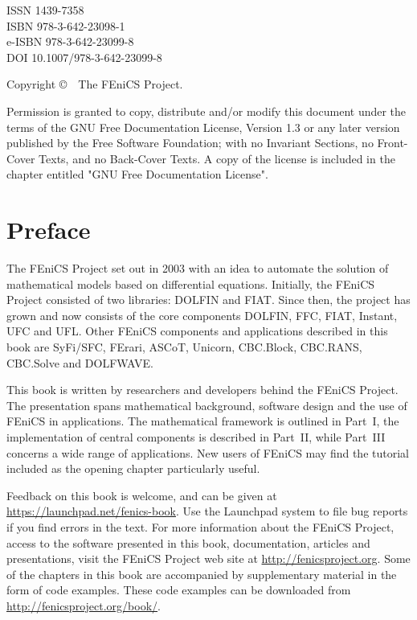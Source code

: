 \vfill

\noindent
ISSN 1439-7358 \\
ISBN 978-3-642-23098-1 \\
e-ISBN 978-3-642-23099-8 \\
DOI 10.1007/978-3-642-23099-8

\vspace{2ex}

\noindent
{\footnotesize Copyright \copyright\ \the\year\ The FEniCS Project.}

\vspace{2ex}

\noindent
{\footnotesize
Permission is granted to copy, distribute and/or modify this document
under the terms of the GNU Free Documentation License, Version 1.3 or
any later version published by the Free Software Foundation; with no
Invariant Sections, no Front-Cover Texts, and no Back-Cover Texts.  A
copy of the license is included in the chapter entitled "GNU Free
Documentation License".}

\tableofcontents

\chapter*{Preface}

\thispagestyle{empty}

The FEniCS Project set out in 2003 with an idea to automate the
solution of mathematical models based on differential equations.
Initially, the FEniCS Project consisted of two libraries: DOLFIN and
FIAT. Since then, the project has grown and now consists of the core
components DOLFIN, FFC, FIAT, Instant, UFC and UFL. Other FEniCS
components and applications described in this book are SyFi/SFC,
FErari, ASCoT, Unicorn, CBC.Block, CBC.RANS, CBC.Solve and DOLFWAVE.

This book is written by researchers and developers behind the FEniCS
Project. The presentation spans mathematical background, software
design and the use of FEniCS in applications. The mathematical
framework is outlined in Part~I, the implementation of central
components is described in Part~II, while Part~III concerns a wide
range of applications. New users of FEniCS may find the tutorial
included as the opening chapter particularly useful.

Feedback on this book is welcome, and can be given at
\url{https://launchpad.net/fenics-book}. Use the Launchpad system to
file bug reports if you find errors in the text. For more information
about the FEniCS Project, access to the software presented in this
book, documentation, articles and presentations, visit the FEniCS
Project web site at \url{http://fenicsproject.org}. Some of the
chapters in this book are accompanied by supplementary material in the
form of code examples. These code examples can be downloaded from
\url{http://fenicsproject.org/book/}.

